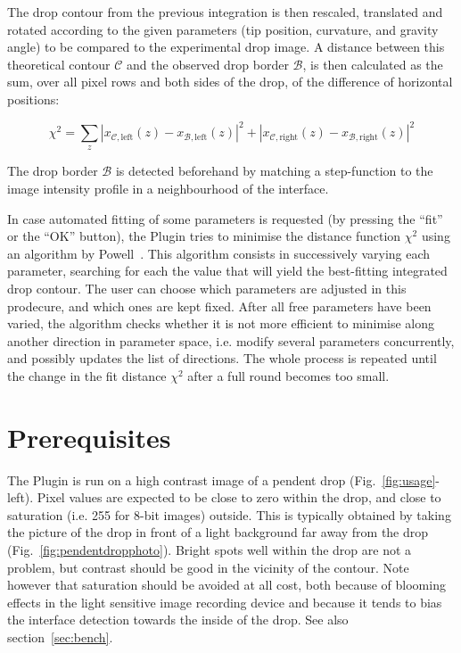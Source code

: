 \documentclass[fleqn]{scrartcl}
\begin{document}
The drop contour from the previous integration is then rescaled,
translated and rotated according to the given parameters (tip
position, curvature, and gravity angle) to be compared to the
experimental drop image. A distance between this theoretical contour
$\mathcal{C}$ and the observed drop border $\mathcal{B}$, is then
calculated as the sum, over all pixel rows and both sides of the drop,
of the difference of horizontal positions:

\[
\chi^2 = \sum_{z} |x_{\mathcal{C},\mathrm{left}}(z) - x_{\mathcal{B},\mathrm{left}}(z)|^2 +
|x_{\mathcal{C},\mathrm{right}}(z) - x_{\mathcal{B},\mathrm{right}}(z)|^2
\]

The drop border $\mathcal{B}$ is detected beforehand by matching a
step-function to the image intensity profile in a neighbourhood of the
interface.

 In case
automated fitting of some parameters is requested (by pressing the
``fit'' or the ``OK'' button), the Plugin tries to minimise the
distance function $\chi^2$ using an algorithm by
Powell~\cite{Powell1965,Brandt1992}. This algorithm consists in
successively varying each parameter, searching for each the value that
will yield the best-fitting integrated drop contour. The user can
choose which parameters are adjusted in this prodecure, and which ones
are kept fixed. After all free parameters have been varied, the
algorithm checks whether it is not more efficient to minimise along
another direction in parameter space, i.e. modify several parameters
concurrently, and possibly updates the list of directions. The whole
process is repeated until the change in the fit distance $\chi^2$
after a full round becomes too small.


\appendix


\section{Prerequisites}
\label{sec:prerequisites}

The Plugin is run on a high contrast image of a pendent drop
(Fig.~\ref{fig:usage}-left). Pixel values are expected to be close to
zero within the drop, and close to saturation (i.e. 255 for 8-bit
images) outside. This is typically obtained by taking the picture of
the drop in front of a light background far away from the drop
(Fig.~\ref{fig:pendentdropphoto}). Bright spots well within the drop
are not a problem, but contrast should be good in the vicinity of the
contour. Note however that saturation should be avoided at all cost,
both because of blooming effects in the light sensitive image
recording device and because it tends to bias the interface detection
towards the inside of the drop. See also section~\ref{sec:bench}.
\end{document}
